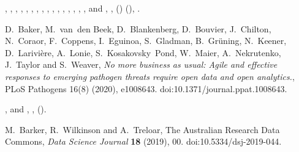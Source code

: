 \documentclass[ds,v1.1.2,openaccess]{iosart2x}%
\begin{document}
\begin{thebibliography}{}
%
\begin{barticle}
,
,
,
,
,
,
,
,
,
,
,
,
,
,
,
,
 and
,
,
()
(),
.
\end{barticle}
%
\OrigBibText
D.~Baker,
M.~van~den Beek,
D.~Blankenberg,
D.~Bouvier,
J.~Chilton,
N.~Coraor,
F.~Coppens,
I.~Eguinoa,
S.~Gladman,
B.~Gr\"{u}ning,
N.~Keener,
D.~Larivi\`{e}re,
A.~Lonie,
S.~Kosakovsky~Pond,
W.~Maier,
A.~Nekrutenko,
J.~Taylor and
S.~Weaver,
\textit{No more business as usual: Agile and effective responses to emerging
pathogen threats require open data and open analytics.},
{PLoS} Pathogens
16(8)
(2020),
e1008643.
doi:10.1371/journal.ppat.1008643.
\endOrigBibText
{}
\endbibitem

%
\begin{barticle}
,
 and
,
,
().
\end{barticle}
%
\OrigBibText
M.~Barker,
R.~Wilkinson and
A.~Treloar,
The Australian Research Data Commons,
\textit{Data Science Journal}
\textbf{18}
(2019), 00.
doi:10.5334/dsj-2019-044.
\endOrigBibText
{}
\endbibitem


\end{thebibliography}
\end{document}
